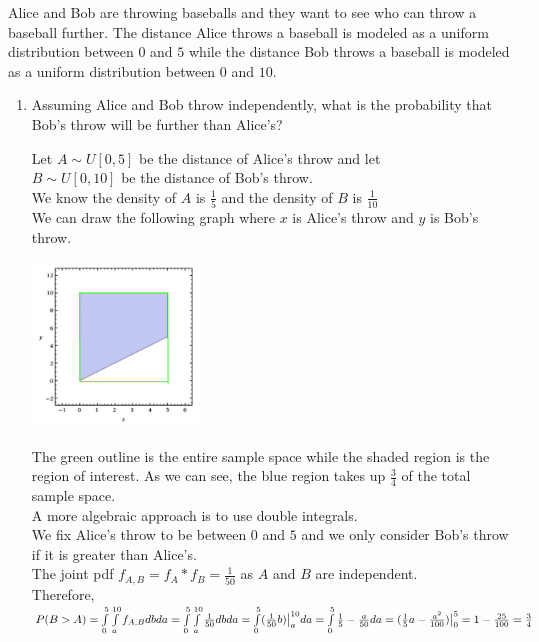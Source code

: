 \question Alice and Bob are throwing baseballs and they want to see who can throw a baseball further. The distance Alice throws a baseball is modeled as a uniform distribution between $0$ and $5$ while the distance Bob throws a baseball is modeled as a uniform distribution between $0$ and $10$. 
\begin{enumerate}[label=(\alph*)]
\item Assuming Alice and Bob throw independently, what is the probability that Bob's throw will be further than Alice's?
\begin{solution}[1cm]
	Let $A \mathtt{\sim} U[0, 5]$ be the distance of Alice's throw and let \\
	$B \mathtt{\sim} U[0, 10]$ be the distance of Bob's throw.  \\
	We know the density of $A$ is $\frac{1}{5}$ and the density of $B$ is $\frac{1}{10}$ \\
	We can draw the following graph where $x$ is Alice's throw and $y$ is Bob's throw. \\
	
	\begin{center}
		\includegraphics[width=5cm]{joint_uniform.png}
	\end{center}
	The green outline is the entire sample space while the shaded region is the region of interest. As we can see, the blue region takes up $\frac{3}{4}$ of the total sample space. \\
	
	A more algebraic approach is to use double integrals. \\
	We fix Alice's throw to be between $0$ and $5$ and we only consider Bob's throw if it is greater than Alice's. \\
	The joint pdf $f_{A, B} = f_A * f_B = \frac{1}{50}$ as $A$ and $B$ are independent.  \\
	Therefore, \\
	$P(B > A)   \\
	= \int\limits_{0}^{5}\int\limits_{a}^{10}f_{A, B} db da \\
	=  \int\limits_{0}^{5}\int\limits_{a}^{10}\frac{1}{50} db da \\
	= \int\limits_{0}^{5} (\frac{1}{50}b)\big|_{a}^{10} da \\
	=  \int\limits_{0}^{5} \frac{1}{5} - \frac{a}{50} da \\
	= (\frac{1}{5}a - \frac{a^2}{100})\big|_{0}^{5} = 1 - \frac{25}{100} = \frac{3}{4}$
\end{solution}


\end{enumerate}
